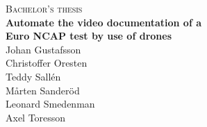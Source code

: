 \newpage
\restoregeometry
\thispagestyle{empty}
\mbox{}


\thispagestyle{empty}
\begin{center}
	\textsc{\large Bachelor's thesis \the\year}\\[4cm]
	\textbf{\Large Automate the video documentation of a \\[0.5cm] Euro NCAP test by use of drones} \\[1.5cm]

 \centering
	{\large Johan Gustafsson \\[0.15cm] Christoffer Oresten \\[0.15cm] Teddy Sallén \\[0.15cm] Mårten Sanderöd \\[0.15cm] Leonard Smedenman \\[0.15cm] Axel Toresson } \setlength{\parskip}{1cm}
	

\end{center}
